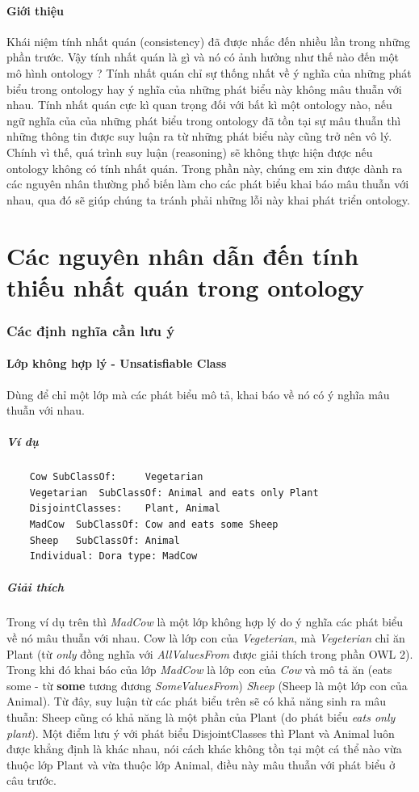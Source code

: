 \paragraph{Giới thiệu} Khái niệm tính nhất quán (consistency) đã được nhắc đến nhiều lần trong những phần trước. Vậy tính nhất quán là gì và nó có ảnh hưởng như thế nào đến một mô hình ontology ?
\hspace*{.05\textwidth} Tính nhất quán chỉ sự thống nhất về ý nghĩa của những phát biểu trong ontology hay ý nghĩa của những phát biểu này không mâu thuẫn với nhau. Tính nhất quán cực kì quan trọng đối với bất kì một ontology nào, nếu ngữ nghĩa của của những phát biểu trong ontology đã tồn tại sự mâu thuẫn thì những thông tin được suy luận ra từ những phát biểu này cũng trở nên vô lý. Chính vì thế, quá trình suy luận (reasoning) sẽ không thực hiện được nếu ontology không có tính nhất quán. Trong phần này, chúng em xin được dành ra các nguyên nhân thường phổ biến làm cho các phát biểu khai báo mâu thuẫn với nhau, qua đó sẽ giúp chúng ta tránh phải những lỗi này khai phát triển ontology.
\clearpage
\section{Các nguyên nhân dẫn đến tính thiếu nhất quán trong ontology}
\subsubsection{Các định nghĩa cần lưu ý \cite{satisfy}}
\paragraph{Lớp không hợp lý - Unsatisfiable Class} Dùng để chỉ một lớp mà các phát biểu mô tả, khai báo về nó có ý nghĩa mâu thuẫn với nhau.
\subparagraph{Ví dụ}
	\begin{verbatim}
	Cow	SubClassOf: 	Vegetarian
	Vegetarian	SubClassOf: Animal and eats only Plant
	DisjointClasses:	Plant, Animal
	MadCow 	SubClassOf: Cow and eats some Sheep
	Sheep 	SubClassOf: Animal
	Individual: Dora type: MadCow
	\end{verbatim}
\subparagraph{Giải thích} Trong ví dụ trên thì \textit{MadCow} là một lớp không hợp lý do ý nghĩa các phát biểu về nó mâu thuẫn với nhau. Cow là lớp con của \textit{Vegeterian}, mà \textit{Vegeterian} chỉ ăn Plant (từ \textit{only} đồng nghĩa với \textit{AllValuesFrom} được giải thích trong phần OWL 2). Trong khi đó khai báo của lớp \textit{MadCow} là lớp con của \textit{Cow} và mô tả ăn (eats some - từ \textbf{some} tương đương \textit{SomeValuesFrom}) \textit{Sheep} (Sheep là một lớp con của Animal). Từ đây, suy luận từ các phát biểu trên sẽ có khả năng sinh ra mâu thuẫn: Sheep cũng có khả năng là một phần của Plant (do phát biểu \textit{eats only plant}). Một điểm lưu ý với phát biểu DisjointClasses thì Plant và Animal luôn được khẳng định là khác nhau, nói cách khác không tồn tại một cá thể nào vừa thuộc lớp Plant và vừa thuộc lớp Animal, điều này mâu thuẫn với phát biểu ở câu trước.  

